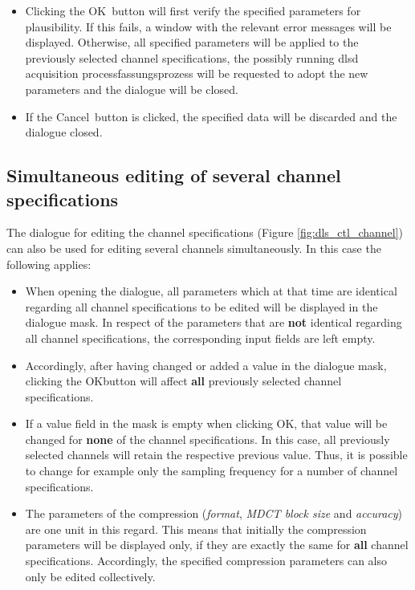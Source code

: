 \documentclass[a4paper,12pt,BCOR6mm,bibtotoc,idxtotoc]{scrbook}
\begin{document}
\begin{itemize} 
\item Clicking the \glqq OK\grqq\  button will first verify the specified parameters for plausibility. If this fails, a window with the relevant error messages will be displayed. Otherwise, all specified parameters will be applied to the previously selected channel specifications, the possibly running dlsd acquisition process\-fas\-sungs\-pro\-zess  will be requested to adopt the new parameters and the dialogue will be closed. 
\item If the \glqq Cancel\grqq\  button is clicked, the specified data will be discarded and the dialogue closed. \end{itemize}


\subsection{Simultaneous editing of several channel specifications} \label{sec:manager_kanaele_edit_parallel}

The dialogue for editing the channel specifications (Figure \ref{fig:dls_ctl_channel}) can also be used for editing several channels simultaneously. In this case the following applies:

\begin{itemize} 
\item When opening the dialogue, all parameters which at that time are identical regarding all channel specifications to be edited will be displayed in the dialogue mask. In respect of the parameters that are \textbf{not} identical regarding all channel specifications, the corresponding input fields are left empty. 
\item Accordingly, after having changed or added a value in the dialogue mask, clicking the \glqq OK\grqq button will affect \textbf{all} previously selected channel specifications. 
\item If a value field in the mask is empty when clicking \glqq OK\grqq, that value will be changed for \textbf{none} of the channel specifications. In this case, all previously selected channels will retain the respective previous value. Thus, it is possible to change for example only the sampling frequency for a number of channel specifications. 
\item The parameters of the compression (\textit{format}, \textit{MDCT block size} and \textit{accuracy}) are one unit in this regard. This means that initially the compression parameters will be displayed only, if they are exactly the same for \textbf{all} channel specifications. Accordingly, the specified compression parameters can also only be edited collectively. \end{itemize}
\end{document}
